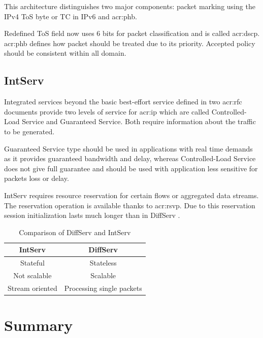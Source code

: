 \documentclass[11pt,openany]{book}
\begin{document}
        This architecture distinguishes two major components: packet marking using the IPv4 ToS byte or TC in IPv6 and
        \gls{acr:phb}.

        \medskip

        Redefined ToS field now uses 6 bits for packet classification and is called \gls{acr:dscp}. \gls{acr:phb}
        defines how packet should be treated due to its priority. Accepted policy should be consistent within all
        domain.


      \subsection{IntServ}

        Integrated services beyond the basic best-effort service defined in two \gls{acr:rfc} documents provide two
        levels of service for \gls{acr:ip} which are called Controlled-Load Service and Guaranteed Service. Both require
        information about the traffic to be generated. 

        Guaranteed Service type should be used in applications with real time demands as it provides guaranteed
        bandwidth and delay, whereas Controlled-Load Service does not give full guarantee and should be used with
        application less sensitive for packets loss or delay.

        IntServ requires resource reservation for certain flows or aggregated data streams. The reservation operation is
        available thanks to \gls{acr:rsvp}. Due to this reservation session initialization lasts much longer than in
        DiffServ \cite{qos2}.

        \begin{table}[ht]
          \centering
          \begin{tabular}{|c|c|}
            \hline
            IntServ         & DiffServ \\
            \hline \hline
            Stateful        & Stateless \\
            \hline
            Not scalable    & Scalable \\
            \hline
            Stream oriented & Processing single packets \\
            \hline
          \end{tabular}

          \caption{Comparison of DiffServ and IntServ}
        \end{table}


    \section*{Summary}
\end{document}
